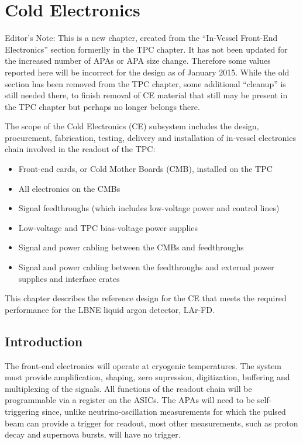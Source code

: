 \chapter{Cold Electronics}
\label{ch:ce}

\begin{editornote}
  Editor's Note:  This is a new chapter, created from the ``In-Vessel Front-End Electronics'' section formerlly in the TPC chapter.
It has not been updated for the increased number of APAs or APA size change.
Therefore some values reported here will be incorrect for the design as of January 2015. 
While the old section has been removed from the TPC chapter, some additional ``cleanup'' is still needed there,
to finish removal of CE material that still may be present in the TPC chapter but perhaps no longer belongs there.
\end{editornote}

The scope of the Cold Electronics (CE) subsystem includes the design, procurement, fabrication, testing,
delivery and installation of in-vessel electronics chain involved in the readout of the TPC:
\begin{itemize}
\item Front-end cards, or Cold Mother Boards (CMB), installed on the TPC
\item All electronics on the CMBs
\item Signal feedthroughs (which includes low-voltage power and control lines)
\item Low-voltage and TPC bias-voltage power supplies
\item Signal and power cabling between the CMBs and feedthroughs
\item Signal and power cabling between the feedthroughs and external power supplies and interface crates
\end{itemize}
This chapter describes the reference design for the CE that meets the required performance for the LBNE liquid argon detector,
LAr-FD.

\section{Introduction}
\label{sec:ce-intro}

The front-end electronics will operate at cryogenic temperatures. The system must provide 
amplification, shaping, zero supression, digitization, buffering and multiplexing of the signals.  All functions of the readout chain will be programmable via a register on the ASICs. The APAs will need to be
self-triggering since, unlike neutrino-oscillation measurements for which the pulsed beam 
can provide a trigger for readout, most other measurements, such as proton decay
and supernova bursts, will have no trigger.  


